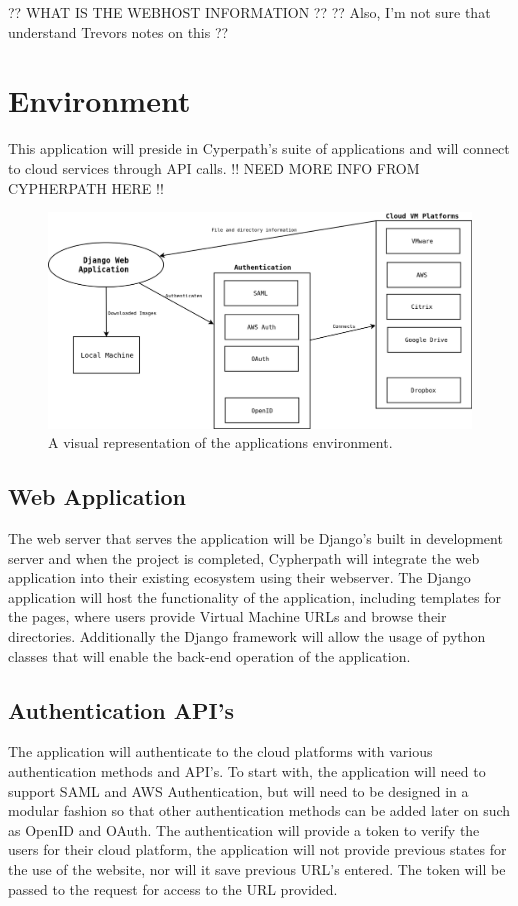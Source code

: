 \documentclass{article}
\begin{document}
	\large ?? WHAT IS THE WEBHOST INFORMATION ?? 
	?? Also, I'm not sure that understand Trevors notes on this ??
	
    \section{Environment}
	\large This application will preside in Cyperpath's suite of applications and will connect to cloud services through API calls. 
    !! NEED MORE INFO FROM CYPHERPATH HERE !!
	
    \begin{figure}[h]
    \includegraphics[scale=.4]{downloader_env}
        \caption{A visual representation of the applications environment.}
    \end{figure}


        \subsection{Web Application}
        The web server that serves the application will be Django's built in development server and when the project is completed, Cypherpath will integrate
        the web application into their existing ecosystem using their webserver. The Django application will host the functionality of the application, including templates for the 
        pages, where users provide Virtual Machine URLs and browse their directories. Additionally the Django framework will allow the usage of python classes that will enable the 
        back-end operation of the application.

        
        \subsection{Authentication API's}
        The application will authenticate to the cloud platforms with various authentication methods and API's. To start with, the application will need to support
        SAML and AWS Authentication, but will need to be designed in a modular fashion so that other authentication methods can be added later on such as OpenID and OAuth.
        The authentication will provide a token to verify the users for their cloud platform, the application will not provide previous states for the use of the 
        website, nor will it save previous URL's entered. The token will be passed to the request for access to the URL provided.
\end{document}

